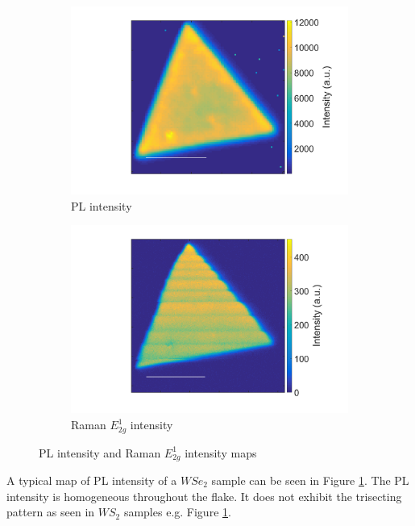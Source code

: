 \begin{figure}[H]
	\begin{center}
		\begin{subfigure}[b]{0.45\textwidth}
			\includegraphics[width=\textwidth]{WSe2/PLIntensity.png}
			\caption{PL intensity}
			\label{fig:WSe2PLIntensityMap}
		\end{subfigure}
		\qquad
		\begin{subfigure}[b]{0.45\textwidth}
			\includegraphics[width=\textwidth]{WSe2/RamanEIntensity.png}
			\caption{Raman $E^1_{2g}$ intensity}
		\end{subfigure}
		\caption{PL intensity and Raman $E^1_{2g}$ intensity maps}
	\end{center}
\end{figure}

A typical map of PL intensity of a $WSe_2$ sample can be seen in Figure \ref{fig:WSe2PLIntensityMap}. The PL intensity is homogeneous throughout the flake. It does not exhibit the trisecting pattern as seen in $WS_2$ samples e.g. Figure \ref{fig:WSe2PLIntensityMap}.
	
